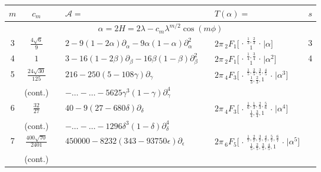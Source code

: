 \documentclass[nofootinbib,preprint]{revtex4-1}
\renewcommand{\arraystretch}{1.3}
\begin{document}
\begin{table}[t]
\begin{center}
\label{tab:Dihedral}
{\renewcommand{\arraystretch}{2}%
\begin{tabularx}{\textwidth}{ c | c | c l | c l | c }
\hline \hline
\;$m$\; &  \;\;\;$c_m$\;\;\; & \hspace{0.1cm} 
& $\mathcal{A}=$\hspace{7.7cm} &\hspace{0.1cm} & $T(\alpha)=$ & \;\;$s$\;\; \\
\hline
\multicolumn{7}{c}{$\alpha = 2H = 2\lambda - c_m \lambda^{m/2}\cos(m\phi) $ } \\
\hline
3 & $\frac{4\sqrt{6}}{9}$ & &
$2 - 9 (1 - 2 \alpha)\partial_{\alpha}- 9  \alpha(1 - \alpha)\partial_{\alpha}^2$   & &
$2\pi\,_2F_1 \Big[ \genfrac..{0pt}{}{
\frac{1}{3},\frac{2}{3}
}{1}\Big| \alpha \Big]$  & 3    \\
4 & $1$  & &
$3 - 16 (1 - 2 \beta)\partial_{\beta}- 16  \beta(1 - \beta)\partial_{\beta}^2$   & &
$2\pi\,_2F_1 \Big[ \genfrac..{0pt}{}{
\frac{1}{4},\frac{3}{4}
}{1}\Big| \alpha^2  \Big]$  & 4   \\
5 & $\frac{24\sqrt{30}}{125}$  & &
$216 - 250 (5 - 108 \gamma)\partial_{\gamma}$ 
  & &
$2\pi\,_4F_3 \Big[ \genfrac..{0pt}{}{
\frac{1}{5},\frac{2}{5},\frac{3}{5},\frac{4}{5}
}{\frac{1}{3},\frac{2}{3},1}\Big| \alpha^3 \Big]$ &     \\
 & \tiny(cont.)  & & \hspace{0.5cm}
$-\ldots - \ldots - 5625 \gamma^3 (1 - \gamma) \partial_{\gamma}^4 $
  & & &     \\
6 & $\frac{32}{27}$  & &
$40 - 9 (27 - 680 \delta)\partial_{\delta}$  & &
$2\pi\,_4F_3 \Big[ \genfrac..{0pt}{}{
\frac{1}{6},\frac{1}{3},\frac{2}{3},\frac{5}{6}
}{\frac{1}{4},\frac{3}{4},1}\Big| \alpha^4 \Big]$   &   \\
 & \tiny(cont.)  & & \hspace{0.5cm}
$-\ldots - \ldots - 1296 \delta^3 (1 - \delta) \partial_{\delta}^4 $
  & & &     \\
7 & \;$\frac{400\sqrt{70}}{2401}$\;  & &
$450000 - 8232 (343 - 93750 \epsilon)\partial_{\epsilon}$  & &
$2\pi\,_6F_5 \Big[ \genfrac..{0pt}{}{
\frac{1}{7},\frac{2}{7},\frac{3}{7},\frac{4}{7},\frac{5}{7},\frac{6}{7}
}{\frac{1}{5},\frac{2}{5},\frac{3}{5},\frac{4}{5},1}\Big| \alpha^5 \Big]$ \;    \\
 & \tiny(cont.)  & & \hspace{0.5cm}

\end{tabularx}}
\end{center}
\end{table}
\end{document}
